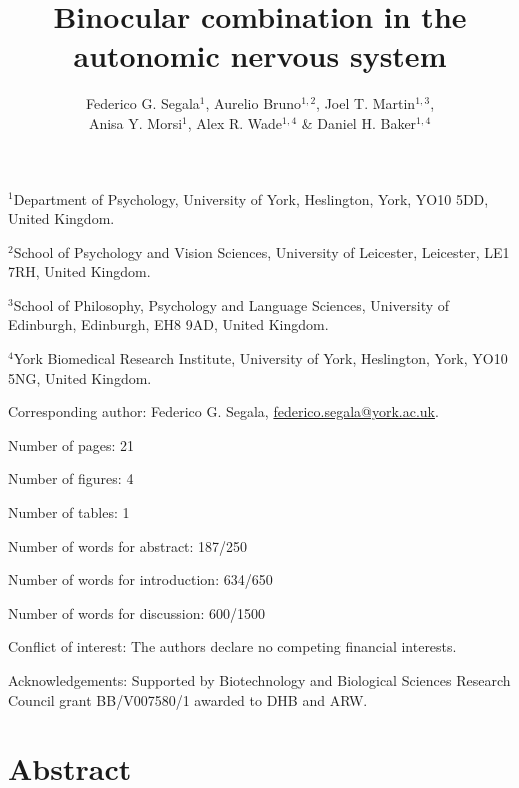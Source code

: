 \documentclass[
]{article}
\title{Binocular combination in the autonomic nervous system}
\author{Federico G. Segala\(^1\), Aurelio Bruno\(^{1,2}\), Joel T. Martin\(^{1,3}\),\\
Anisa Y. Morsi\(^1\), Alex R. Wade\(^{1,4}\) \& Daniel H. Baker\(^{1,4}\)}
\date{}
\begin{document}
\maketitle

\(^1\)Department of Psychology, University of York, Heslington, York, YO10 5DD, United Kingdom.

\(^2\)School of Psychology and Vision Sciences, University of Leicester, Leicester, LE1 7RH, United Kingdom.

\(^3\)School of Philosophy, Psychology and Language Sciences, University of Edinburgh, Edinburgh, EH8 9AD, United Kingdom.

\(^4\)York Biomedical Research Institute, University of York, Heslington, York, YO10 5NG, United Kingdom.

Corresponding author: Federico G. Segala, \url{federico.segala@york.ac.uk}.

Number of pages: 21

Number of figures: 4

Number of tables: 1

Number of words for abstract: 187/250

Number of words for introduction: 634/650

Number of words for discussion: 600/1500

Conflict of interest: The authors declare no competing financial interests.

Acknowledgements: Supported by Biotechnology and Biological Sciences Research Council grant BB/V007580/1 awarded to DHB and ARW.

\pagebreak

\section{Abstract}\label{abstract}
\end{document}
